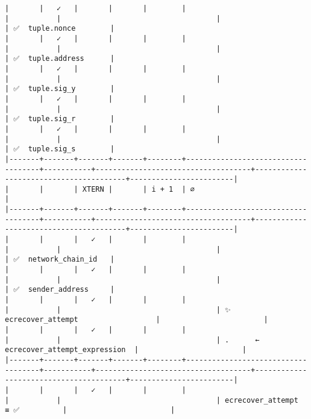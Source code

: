 \documentclass[varwidth=\maxdimen,margin=0.5cm,multi={verbatim}]{standalone}
\begin{document}
\begin{verbatim}
|       |   ✓   |       |       |        |                                    |           |                                    |                                        | ✅  tuple.nonce        |
|       |   ✓   |       |       |        |                                    |           |                                    |                                        | ✅  tuple.address      |
|       |   ✓   |       |       |        |                                    |           |                                    |                                        | ✅  tuple.sig_y        |
|       |   ✓   |       |       |        |                                    |           |                                    |                                        | ✅  tuple.sig_r        |
|       |   ✓   |       |       |        |                                    |           |                                    |                                        | ✅  tuple.sig_s        |
|-------+-------+-------+-------+--------+------------------------------------+-----------+------------------------------------+----------------------------------------+------------------------|
|       |       | XTERN |       | i + 1  | ∅                                  |
|-------+-------+-------+-------+--------+------------------------------------+-----------+------------------------------------+----------------------------------------+------------------------|
|       |       |   ✓   |       |        |                                    |           |                                    |                                        | ✅  network_chain_id   |
|       |       |   ✓   |       |        |                                    |           |                                    |                                        | ✅  sender_address     |
|       |       |   ✓   |       |        |                                    |           |                                    | ✨  ecrecover_attempt                  |                        |
|       |       |   ✓   |       |        |                                    |           |                                    | .      ← ecrecover_attempt_expression  |                        |
|-------+-------+-------+-------+--------+------------------------------------+-----------+------------------------------------+----------------------------------------+------------------------|
|       |       |   ✓   |       |        |                                    |           |                                    | ecrecover_attempt        ≡ ✅          |                        |

\end{verbatim}
\end{document}
